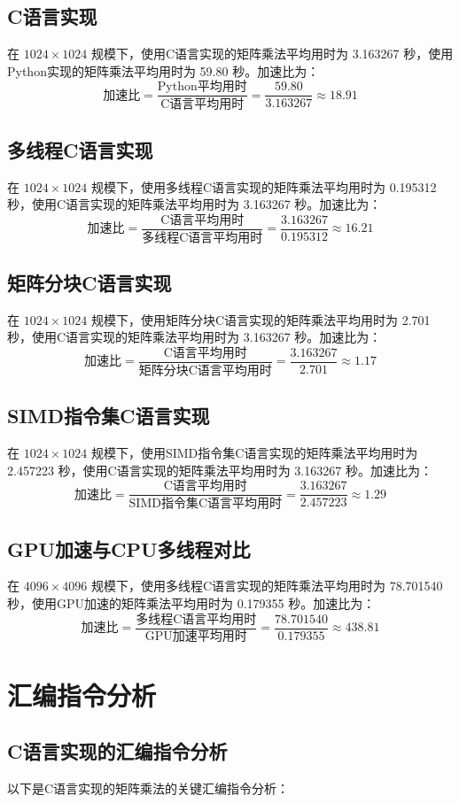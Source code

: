 \documentclass[a4paper,12pt]{ctexart}
\begin{document}
\subsection{C语言实现}
在 $1024 \times 1024$ 规模下，使用C语言实现的矩阵乘法平均用时为 3.163267 秒，使用Python实现的矩阵乘法平均用时为 59.80 秒。加速比为：
\[
\text{加速比} = \frac{\text{Python平均用时}}{\text{C语言平均用时}} = \frac{59.80}{3.163267} \approx 18.91
\]
\subsection{多线程C语言实现}
在 $1024 \times 1024$ 规模下，使用多线程C语言实现的矩阵乘法平均用时为 0.195312 秒，使用C语言实现的矩阵乘法平均用时为 3.163267 秒。加速比为：
\[
\text{加速比} = \frac{\text{C语言平均用时}}{\text{多线程C语言平均用时}} = \frac{3.163267}{0.195312} \approx 16.21
\]

\subsection{矩阵分块C语言实现}
在 $1024 \times 1024$ 规模下，使用矩阵分块C语言实现的矩阵乘法平均用时为 2.701 秒，使用C语言实现的矩阵乘法平均用时为 3.163267 秒。加速比为：
\[
\text{加速比} = \frac{\text{C语言平均用时}}{\text{矩阵分块C语言平均用时}} = \frac{3.163267}{2.701} \approx 1.17
\]

\subsection{SIMD指令集C语言实现}
在 $1024 \times 1024$ 规模下，使用SIMD指令集C语言实现的矩阵乘法平均用时为 2.457223 秒，使用C语言实现的矩阵乘法平均用时为 3.163267 秒。加速比为：
\[
\text{加速比} = \frac{\text{C语言平均用时}}{\text{SIMD指令集C语言平均用时}} = \frac{3.163267}{2.457223} \approx 1.29
\]

\subsection{GPU加速与CPU多线程对比}
在 $4096 \times 4096$ 规模下，使用多线程C语言实现的矩阵乘法平均用时为 78.701540 秒，使用GPU加速的矩阵乘法平均用时为 0.179355 秒。加速比为：
\[
\text{加速比} = \frac{\text{多线程C语言平均用时}}{\text{GPU加速平均用时}} = \frac{78.701540}{0.179355} \approx 438.81
\]

\section{汇编指令分析}
\subsection{C语言实现的汇编指令分析}
以下是C语言实现的矩阵乘法的关键汇编指令分析：
\end{document}
